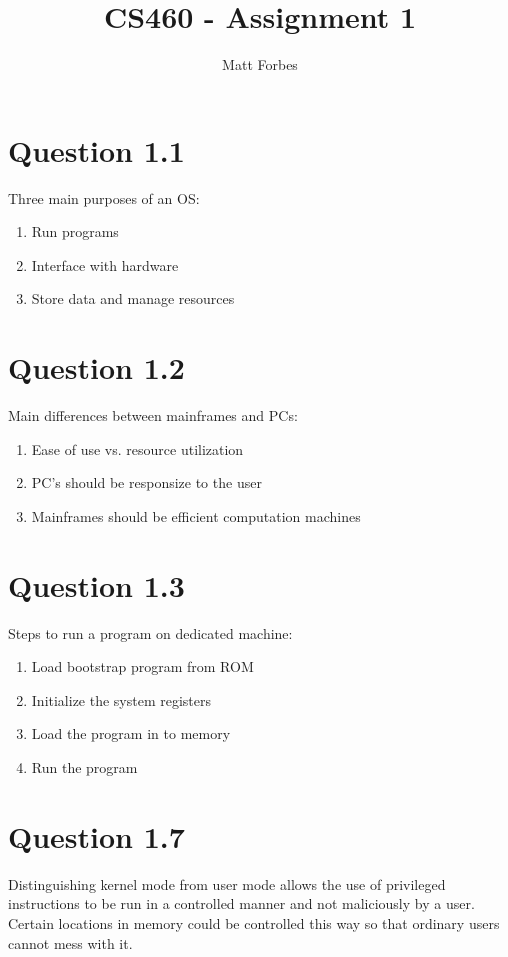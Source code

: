 \documentclass[10pt]{article}
\begin{document}
\title{CS460 - Assignment 1}
\author{Matt Forbes}
\maketitle
\newpage

\section{Question 1.1}
Three main purposes of an OS:
\begin{enumerate}
\item Run programs
\item Interface with hardware
\item Store data and manage resources
\end{enumerate}

\section{Question 1.2}
Main differences between mainframes and PCs:
\begin{enumerate}
\item Ease of use vs. resource utilization
\item PC's should be responsize to the user
\item Mainframes should be efficient computation machines
\end{enumerate}

\section{Question 1.3}
Steps to run a program on dedicated machine:
\begin{enumerate}
\item Load bootstrap program from ROM
\item Initialize the system registers
\item Load the program in to memory
\item Run the program
\end{enumerate}

\section{Question 1.7}
Distinguishing kernel mode from user mode allows the use of privileged
instructions to be run in a controlled manner and not maliciously by a
user. Certain locations in memory could be controlled this way so that
ordinary users cannot mess with it.
\end{document}
